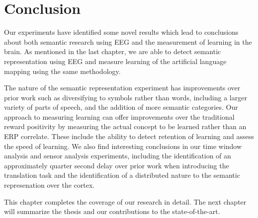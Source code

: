\section{Conclusion}
Our experiments have identified some novel results which lead to conclusions 
about both semantic research using EEG and the measurement of learning in the 
brain. As mentioned in the last chapter, we are able to detect semantic 
representation using EEG and measure learning of the artificial language 
mapping using the same methodology. 

The nature of the semantic representation experiment has improvements over 
prior work such as diversifying to symbols rather than words, including a 
larger variety of parts of speech, and the addition of more semantic 
categories. Our approach to measuring learning can offer improvements over the 
traditional reward positivity by measuring the actual concept to be learned 
rather than an ERP correlate. These include the ability to detect retention of 
learning and assess the speed of learning. We also find interesting conclusions 
in our time window analysis and sensor analysis experiments, including the 
identification of an approximately quarter second delay over prior work when 
introducing the translation task and the identification of a distributed nature 
to the semantic represenation over the cortex. 

This chapter completes the coverage of our research in detail. The next chapter 
will summarize the thesis and our contributions to the state-of-the-art.

